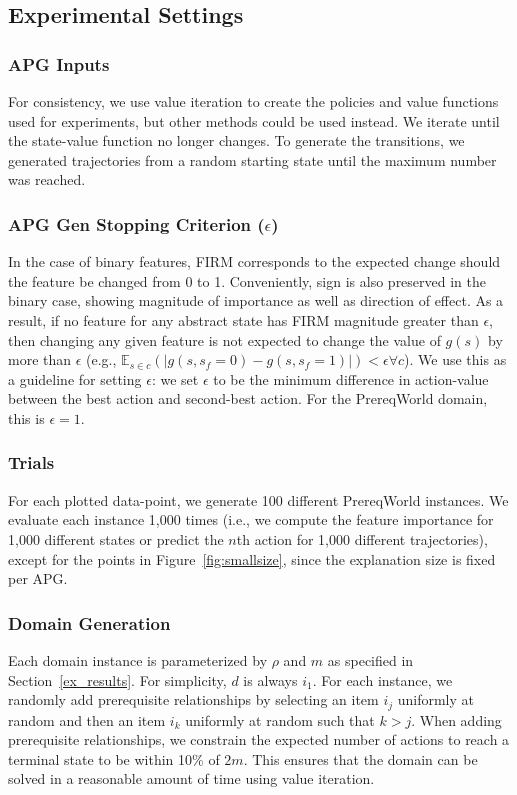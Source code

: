 \documentclass[letterpaper]{article} %
\begin{document}
\subsection{Experimental Settings} \label{em_settings}

\subsubsection{APG Inputs}
For consistency, we use value iteration \cite{SuttonAndBarto} to create the policies and value functions used for experiments, but other methods could be used instead.
We iterate until the state-value function no longer changes.
To generate the transitions, we generated trajectories from a random starting state until the maximum number was reached.

\subsubsection{APG Gen Stopping Criterion ($\epsilon$)}
In the case of binary features, FIRM corresponds to the expected change should the feature be changed from 0 to 1.
Conveniently, sign is also preserved in the binary case, showing magnitude of importance as well as direction of effect.
As a result, if no feature for any abstract state has FIRM magnitude greater than $\epsilon$, then changing any given feature is not expected to change the value of $g(s)$ by more than $\epsilon$ (e.g., $\mathbb{E}_{s \in c} ( | g(s, s_f=0) - g(s, s_f=1) | ) < \epsilon \forall c$).
We use this as a guideline for setting $\epsilon$: we set $\epsilon$ to be the minimum difference in action-value between the best action and second-best action.
For the PrereqWorld domain, this is $\epsilon = 1$.

\subsubsection{Trials}
For each plotted data-point, we generate 100 different PrereqWorld instances.
We evaluate each instance 1,000 times (i.e., we compute the feature importance for 1,000 different states or predict the $n$th action for 1,000 different trajectories), except for the points in Figure~\ref{fig:smallsize}, since the explanation size is fixed per APG.

\subsubsection{Domain Generation}
Each domain instance is parameterized by $\rho$ and $m$ as specified in Section~\ref{ex_results}.
For simplicity, $d$ is always $i_1$.
For each instance, we randomly add prerequisite relationships by selecting an item $i_j$ uniformly at random and then an item $i_k$ uniformly at random such that $k>j$. When adding prerequisite relationships, we constrain the expected number of actions to reach a terminal state to be within 10\% of $2m$.
This ensures that the domain can be solved in a reasonable amount of time using value iteration.
\end{document}
